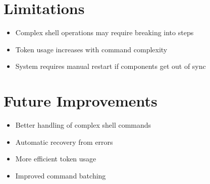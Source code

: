 \documentclass{article}
\begin{document}
\section{Limitations}
\begin{itemize}
    \item Complex shell operations may require breaking into steps
    \item Token usage increases with command complexity
    \item System requires manual restart if components get out of sync
\end{itemize}

\section{Future Improvements}
\begin{itemize}
    \item Better handling of complex shell commands
    \item Automatic recovery from errors
    \item More efficient token usage
    \item Improved command batching
\end{itemize}
\end{document}
